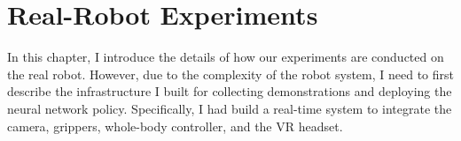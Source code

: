 \chapter{Real-Robot Experiments}

In this chapter, I introduce the details of how our experiments are conducted on the real robot. 
However, due to the complexity of the robot system, I need to first describe the infrastructure I built for collecting demonstrations and deploying the neural network policy. Specifically, I had build a real-time system to integrate the camera, grippers, whole-body controller, and the VR headset. 
